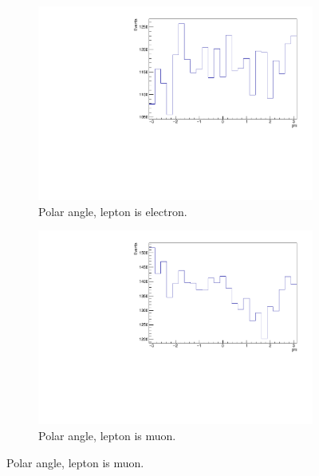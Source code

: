 \begin{figure}[H]
  \begin{subfigure}{0.45\textwidth}%
    \centering%
    \includegraphics[width=\textwidth]{plots/ttbar_distributions/ttbar.el_jet_phi_max.pdf}%
    \caption{Polar angle, lepton is electron.}%
    \label{fig:4e}%
  \end{subfigure}%
  \hfill
  \begin{subfigure}{0.45\textwidth}%
    \centering%
    \includegraphics[width=\textwidth]{plots/ttbar_distributions/ttbar.mu_jet_phi_max.pdf}%
    \caption{Polar angle, lepton is muon.}%
    \label{fig:4f}%
  \end{subfigure}%


\end{figure}
